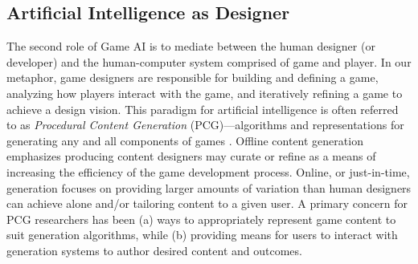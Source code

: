 \documentclass[conference]{IEEEtran}
\begin{document}
\subsection{Artificial Intelligence as Designer}


%
The second role of Game AI is to mediate between the human designer (or developer) and the human-computer system comprised of game and player.  
In our metaphor, game designers are responsible for building and defining a game, analyzing how players interact with the game, and iteratively refining a game to achieve a design vision. 
%
This paradigm for artificial intelligence is often referred to as {\em Procedural Content Generation} (PCG)---algorithms and representations for generating any and all components of games \cite{hendrikx2013:pcg, togelius2011:sbpcg, yannakakis2012:gameai-revisited}.
% 
%
Offline content generation emphasizes producing content designers may curate or refine as a means of increasing the efficiency of the game development process. %
Online, or just-in-time, generation focuses on providing larger amounts of variation than human designers can achieve alone and/or tailoring content to a given user. %
A primary concern for PCG researchers has been (a) ways to appropriately represent game content to suit generation algorithms, while (b) providing means for users to interact with generation systems to author desired content and outcomes.
\end{document}
